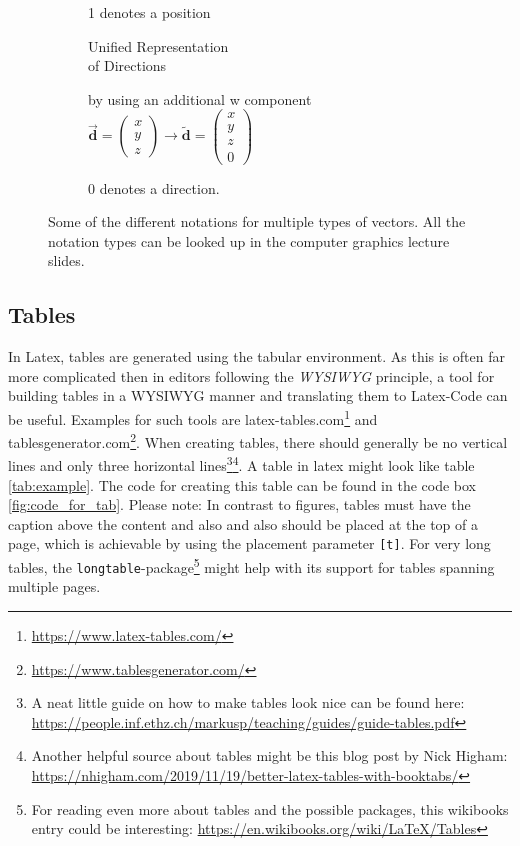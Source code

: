 \begin{figure}[t]
\begin{subfigure}{0.4\textwidth}
		
		1 denotes a position
	\end{subfigure}
	{\color{gray!10}\vrule}
	\begin{subfigure}{0.4\textwidth}
		\centering
		\large
		\begin{bfseries}
			\textcolor{cddarkblue}{Unified Representation \\ of Directions} \\
		\end{bfseries}
		\footnotesize
		by using an additional w component		\\
		$\bm{\vec{d}}=\begin{pmatrix} x\\ y\\ z \end{pmatrix} \rightarrow \bm{\widetilde{d}} = \begin{pmatrix} x\\ y\\ z \\ 0 \end{pmatrix} $
		
		0 denotes a direction.
	\end{subfigure}

\caption{Some of the different notations for multiple types of vectors. All the notation types can be looked up in the computer graphics lecture slides.}
\label{fig:eq_ex}
\end{figure}


\subsection{Tables}
\label{texbas:tab}
In Latex, tables are generated using the tabular environment.
As this is often far more complicated then in editors following the \emph{\ac{WYSIWYG}} principle, a tool for building tables in a \ac{WYSIWYG} manner and translating them to Latex-Code can be useful.
Examples for such tools are latex-tables.com\footnote{\url{https://www.latex-tables.com/}} and tablesgenerator.com\footnote{\url{https://www.tablesgenerator.com/}}.
When creating tables, there should generally be no vertical lines and only three horizontal lines\footnote{A neat little guide on how to make tables look nice can be found here: \url{https://people.inf.ethz.ch/markusp/teaching/guides/guide-tables.pdf}}\footnote{Another helpful source about tables might be this blog post by Nick Higham: \url{https://nhigham.com/2019/11/19/better-latex-tables-with-booktabs/}}.
A table in latex might look like table \ref{tab:example}. The code for creating this table can be found in the code box \ref{fig:code_for_tab}. Please note: In contrast to figures, tables must have the caption above the content and also and also should be placed at the top of a page, which is achievable by using the placement parameter \texttt{[t]}. For very long tables, the \texttt{longtable}-package\footnote{For reading even more about tables and the possible packages, this wikibooks entry could be interesting: \url{https://en.wikibooks.org/wiki/LaTeX/Tables}} might help with its support for tables spanning multiple pages. 


